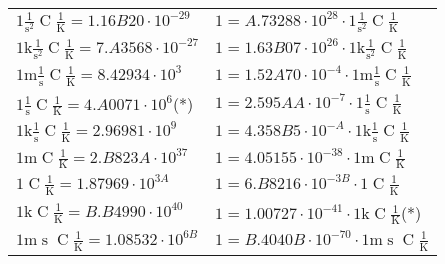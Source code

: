\begin{center}
\begin{longtable}{l l}
{\color{black}$1 \bm{\mathrm{ }}{}\frac1{\operatorname{s}^2}{\operatorname{C}}\frac1{\operatorname{K}} = 1.16B20\cdot10^{-29} $}   & {\color{black}$ 1 = A.73288\cdot10^{28} \cdot 1 \bm{\mathrm{ }}{}\frac1{\operatorname{s}^2}{\operatorname{C}}\frac1{\operatorname{K}}$}  \\
{\color{gray}$1 \bm{\mathrm{ k}}{}\frac1{\operatorname{s}^2}{\operatorname{C}}\frac1{\operatorname{K}} = 7.A3568\cdot10^{-27} $}   & {\color{gray}$ 1 = 1.63B07\cdot10^{26} \cdot 1 \bm{\mathrm{ k}}{}\frac1{\operatorname{s}^2}{\operatorname{C}}\frac1{\operatorname{K}}$}  \\
{\color{gray}$1 \bm{\mathrm{ m}}{}\frac1{\operatorname{s}}{\operatorname{C}}\frac1{\operatorname{K}} = 8.42934\cdot10^{3} $}   & {\color{gray}$ 1 = 1.52A70\cdot10^{-4} \cdot 1 \bm{\mathrm{ m}}{}\frac1{\operatorname{s}}{\operatorname{C}}\frac1{\operatorname{K}}$}  \\
{\color{black}$1 \bm{\mathrm{ }}{}\frac1{\operatorname{s}}{\operatorname{C}}\frac1{\operatorname{K}} = 4.A0071\cdot10^{6} $}\quad(*) & {\color{black}$ 1 = 2.595AA\cdot10^{-7} \cdot 1 \bm{\mathrm{ }}{}\frac1{\operatorname{s}}{\operatorname{C}}\frac1{\operatorname{K}}$}  \\
{\color{gray}$1 \bm{\mathrm{ k}}{}\frac1{\operatorname{s}}{\operatorname{C}}\frac1{\operatorname{K}} = 2.96981\cdot10^{9} $}   & {\color{gray}$ 1 = 4.358B5\cdot10^{-A} \cdot 1 \bm{\mathrm{ k}}{}\frac1{\operatorname{s}}{\operatorname{C}}\frac1{\operatorname{K}}$}  \\
{\color{gray}$1 \bm{\mathrm{ m}}{}{}{\operatorname{C}}\frac1{\operatorname{K}} = 2.B823A\cdot10^{37} $}   & {\color{gray}$ 1 = 4.05155\cdot10^{-38} \cdot 1 \bm{\mathrm{ m}}{}{}{\operatorname{C}}\frac1{\operatorname{K}}$}  \\
{\color{black}$1 \bm{\mathrm{ }}{}{}{\operatorname{C}}\frac1{\operatorname{K}} = 1.87969\cdot10^{3A} $}   & {\color{black}$ 1 = 6.B8216\cdot10^{-3B} \cdot 1 \bm{\mathrm{ }}{}{}{\operatorname{C}}\frac1{\operatorname{K}}$}  \\
{\color{gray}$1 \bm{\mathrm{ k}}{}{}{\operatorname{C}}\frac1{\operatorname{K}} = B.B4990\cdot10^{40} $}   & {\color{gray}$ 1 = 1.00727\cdot10^{-41} \cdot 1 \bm{\mathrm{ k}}{}{}{\operatorname{C}}\frac1{\operatorname{K}}$}\quad(*)\\
{\color{gray}$1 \bm{\mathrm{ m}}{}{\operatorname{s}}{\operatorname{C}}\frac1{\operatorname{K}} = 1.08532\cdot10^{6B} $}   & {\color{gray}$ 1 = B.4040B\cdot10^{-70} \cdot 1 \bm{\mathrm{ m}}{}{\operatorname{s}}{\operatorname{C}}\frac1{\operatorname{K}}$}  \\

\end{longtable}
\end{center}
